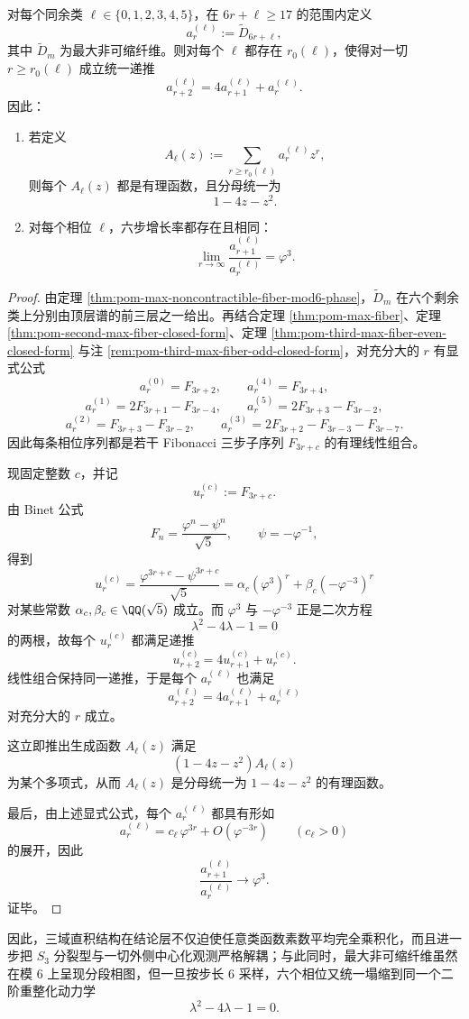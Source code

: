 \begin{theorem}\label{thm:xi-time-part62di-max-noncontractible-fiber-sixstep-renormalization}
对每个同余类 \(\ell\in\{0,1,2,3,4,5\}\)，在 \(6r+\ell\ge 17\) 的范围内定义
\[
a_r^{(\ell)}:=\widetilde D_{6r+\ell},
\]
其中 \(\widetilde D_m\) 为最大非可缩纤维。则对每个 \(\ell\) 都存在 \(r_0(\ell)\)，使得对一切 \(r\ge r_0(\ell)\) 成立统一递推
\[
a_{r+2}^{(\ell)}=4a_{r+1}^{(\ell)}+a_r^{(\ell)}.
\]
因此：
\begin{enumerate}
  \item 若定义
        \[
        A_\ell(z):=\sum_{r\ge r_0(\ell)}a_r^{(\ell)}z^r,
        \]
        则每个 \(A_\ell(z)\) 都是有理函数，且分母统一为
        \[
        1-4z-z^2.
        \]
  \item 对每个相位 \(\ell\)，六步增长率都存在且相同：
        \[
        \lim_{r\to\infty}\frac{a_{r+1}^{(\ell)}}{a_r^{(\ell)}}=\varphi^3.
        \]
\end{enumerate}
\end{theorem}
\begin{proof}
由定理 \ref{thm:pom-max-noncontractible-fiber-mod6-phase}，\(\widetilde D_m\) 在六个剩余类上分别由顶层谱的前三层之一给出。再结合定理 \ref{thm:pom-max-fiber}、定理 \ref{thm:pom-second-max-fiber-closed-form}、定理 \ref{thm:pom-third-max-fiber-even-closed-form} 与注 \ref{rem:pom-third-max-fiber-odd-closed-form}，对充分大的 \(r\) 有显式公式
\[
a_r^{(0)}=F_{3r+2},
\qquad
a_r^{(4)}=F_{3r+4},
\]
\[
a_r^{(1)}=2F_{3r+1}-F_{3r-4},
\qquad
a_r^{(5)}=2F_{3r+3}-F_{3r-2},
\]
\[
a_r^{(2)}=F_{3r+3}-F_{3r-2},
\qquad
a_r^{(3)}=2F_{3r+2}-F_{3r-3}-F_{3r-7}.
\]
因此每条相位序列都是若干 Fibonacci 三步子序列 \(F_{3r+c}\) 的有理线性组合。

现固定整数 \(c\)，并记
\[
u_r^{(c)}:=F_{3r+c}.
\]
由 Binet 公式
\[
F_n=\frac{\varphi^n-\psi^n}{\sqrt5},
\qquad
\psi=-\varphi^{-1},
\]
得到
\[
u_r^{(c)}
=
\frac{\varphi^{3r+c}-\psi^{3r+c}}{\sqrt5}
=
\alpha_c(\varphi^3)^r+\beta_c(-\varphi^{-3})^r
\]
对某些常数 \(\alpha_c,\beta_c\in\QQ(\sqrt5)\) 成立。而 \(\varphi^3\) 与 \(-\varphi^{-3}\) 正是二次方程
\[
\lambda^2-4\lambda-1=0
\]
的两根，故每个 \(u_r^{(c)}\) 都满足递推
\[
u_{r+2}^{(c)}=4u_{r+1}^{(c)}+u_r^{(c)}.
\]
线性组合保持同一递推，于是每个 \(a_r^{(\ell)}\) 也满足
\[
a_{r+2}^{(\ell)}=4a_{r+1}^{(\ell)}+a_r^{(\ell)}
\]
对充分大的 \(r\) 成立。

这立即推出生成函数 \(A_\ell(z)\) 满足
\[
(1-4z-z^2)A_\ell(z)
\]
为某个多项式，从而 \(A_\ell(z)\) 是分母统一为 \(1-4z-z^2\) 的有理函数。

最后，由上述显式公式，每个 \(a_r^{(\ell)}\) 都具有形如
\[
a_r^{(\ell)}=c_\ell\,\varphi^{3r}+O(\varphi^{-3r})
\qquad
(c_\ell>0)
\]
的展开，因此
\[
\frac{a_{r+1}^{(\ell)}}{a_r^{(\ell)}}\longrightarrow \varphi^3.
\]
证毕。
\end{proof}

\noindent
因此，三域直积结构在结论层不仅迫使任意类函数素数平均完全乘积化，而且进一步把 \(S_3\) 分裂型与一切外侧中心化观测严格解耦；与此同时，最大非可缩纤维虽然在模 \(6\) 上呈现分段相图，但一旦按步长 \(6\) 采样，六个相位又统一塌缩到同一个二阶重整化动力学
\[
\lambda^2-4\lambda-1=0.
\]

\endinput
